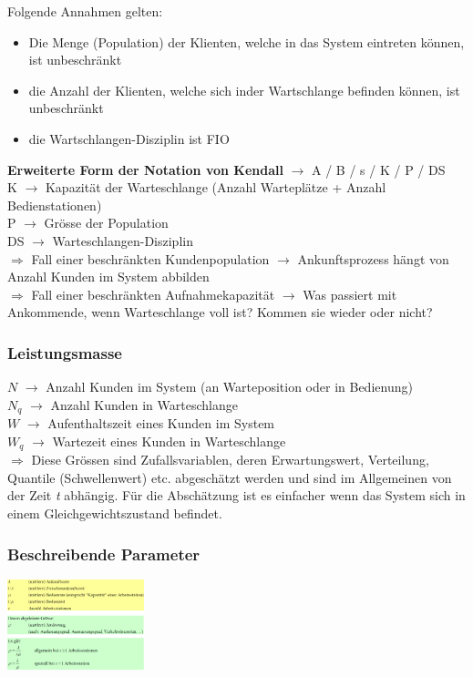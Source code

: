 \documentclass{report}
\newenvironment{Figure}
	{\par\medskip\noindent\minipage{\linewidth}}
	{\endminipage\par\medskip}
\theoremstyle{definition}
\theoremstyle{example}
\begin{document}
Folgende Annahmen gelten:
\begin{itemize}
   \item Die Menge (Population) der Klienten, welche in das System eintreten können, ist unbeschränkt
   \item die Anzahl der Klienten, welche sich inder Wartschlange befinden können, ist unbeschränkt
   \item die Wartschlangen-Disziplin ist FIO
\end{itemize}

\textbf{Erweiterte Form der Notation von Kendall} $\rightarrow$ A / B / s / K / P / DS\\
K $\rightarrow$ Kapazität der Warteschlange (Anzahl Warteplätze + Anzahl Bedienstationen)\\
P $\rightarrow$ Grösse der Population\\
DS $\rightarrow$ Warteschlangen-Disziplin\\

$\Rightarrow$ Fall einer beschränkten Kundenpopulation $\rightarrow$ Ankunftsprozess hängt von Anzahl Kunden im System abbilden\\
$\Rightarrow$ Fall einer beschränkten Aufnahmekapazität $\rightarrow$ Was passiert mit Ankommende, wenn Warteschlange voll ist? Kommen sie wieder oder nicht?

   \subsubsection{Leistungsmasse}
$N$ $\rightarrow$ Anzahl Kunden im System (an Warteposition oder in Bedienung)\\
$N_q$ $\rightarrow$ Anzahl Kunden in Warteschlange\\
$W$ $\rightarrow$ Aufenthaltszeit eines Kunden im System\\
$W_q$ $\rightarrow$ Wartezeit eines Kunden in Warteschlange\\
$\Rightarrow$ Diese Grössen sind Zufallsvariablen, deren Erwartungswert, Verteilung, Quantile (Schwellenwert) etc. abgeschätzt werden und sind im Allgemeinen von der Zeit \textit{t} abhängig. 
Für die Abschätzung ist es einfacher wenn das System sich in einem Gleichgewichtszustand befindet.

      \subsubsection{Beschreibende Parameter}
\begin{Figure}
\centering
\includegraphics[width=150px]{img/BeschreibendeParamter.png}
	\label{fig:Abbildung der beschreibenden Parameter}
\end{Figure}
\end{document}

